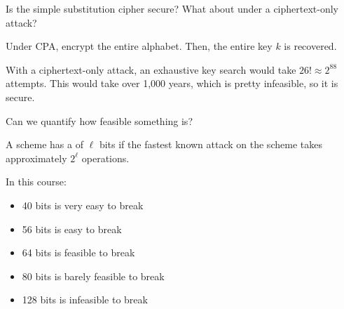 \documentclass[class=co487,notes]{agony}
\begin{document}
\begin{example}
  Is the simple substitution cipher secure?
  What about under a ciphertext-only attack?
\end{example}
\begin{sol}
  Under CPA, encrypt the entire alphabet.
  Then, the entire key $k$ is recovered.

  With a ciphertext-only attack, an exhaustive key search would take
  $26! \approx 2^{88}$ attempts.
  This would take over 1,000 years, which is pretty infeasible,
  so it is secure.
\end{sol}

Can we quantify how feasible something is?

\begin{defn}
  A scheme has a  of $\ell$ bits if
  the fastest known attack on the scheme takes approximately $2^\ell$ operations.
\end{defn}

\begin{convention}
  In this course:
  \begin{itemize}[nosep]
    \item 40 bits is very easy to break
    \item 56 bits is easy to break
    \item 64 bits is feasible to break
    \item 80 bits is barely feasible to break
    \item 128 bits is infeasible to break
  \end{itemize}
\end{convention}
\end{document}

